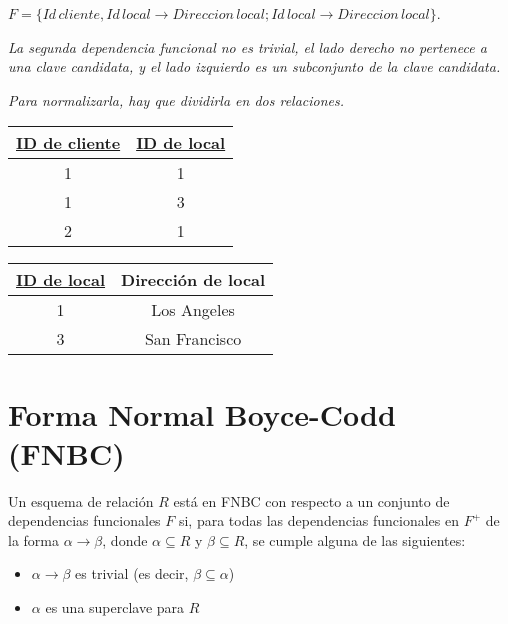 \documentclass[a4paper, twoside]{article}
\begin{document}
$F=\{Id\, cliente,Id\, local\to Direccion\, local;Id\, local\to Direccion\, local\}$.

\emph{La segunda dependencia funcional no es trivial, el lado derecho no pertenece a una clave candidata, y el lado izquierdo es un subconjunto de la clave candidata.}

\emph{Para normalizarla, hay que dividirla en dos relaciones.}\\

\begin{minipage}{0.5\textwidth}
	\begin{center}
		\begin{tabular}{|c|c|}
			\hline 
			\uline{ID de cliente} & \uline{ID de local}\\
			\hline 
			\hline 
			1 & 1\\
			\hline 
			1 & 3\\
			\hline 
			2 & 1\\
			\hline 
		\end{tabular}
	\end{center}
\end{minipage}
\begin{minipage}{0.5\textwidth}
	\begin{center}
		\begin{tabular}{|c|c|}
			\hline 
			\uline{ID de local} & Dirección de local\\
			\hline 
			\hline 
			1 & Los Angeles\\
			\hline 
			3 & San Francisco\\
			\hline 
		\end{tabular}
	\end{center}
\end{minipage}

\section{Forma Normal Boyce-Codd (FNBC)}
Un esquema de relación $R$ está en FNBC con respecto a un conjunto de dependencias funcionales $F$ si, para todas las dependencias funcionales en $F^{+}$ de la forma $\alpha\to\beta$, donde $\alpha\subseteq R$ y $\beta\subseteq R$, se cumple alguna de las siguientes:
\begin{itemize}
	\item $\alpha\to\beta$ es trivial (es decir, $\beta\subseteq\alpha$)
	\item $\alpha$ es una superclave para $R$ 
\end{itemize}
\end{document}
